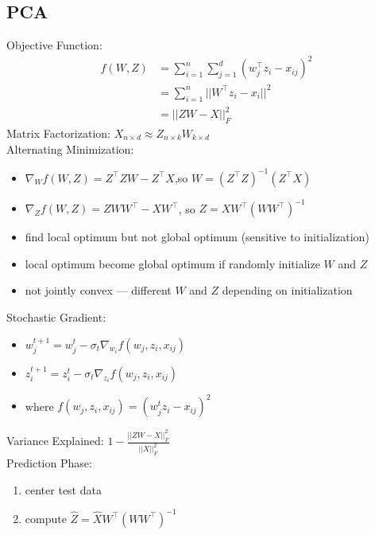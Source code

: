 \documentclass[10pt,landscape,a4paper]{article}
\begin{document}
\begin{multicols*}{5}

\section{PCA}
Objective Function:
\begin{align*}
    f(W,Z) &= \sum_{i=1}^{n} \sum_{j=1}^{d} (w_j^\intercal z_i - x_{ij})^2 \\
    &= \sum_{i=1}^{n} ||W^\intercal z_i - x_i||^2 \\
    &= ||ZW-X||_F^2
\end{align*}
Matrix Factorization: \(X_{n \times d} \approx Z_{n \times k} W_{k \times d}\) \\
Alternating Minimization:
\begin{itemize}
    \item \(\nabla_W f(W,Z) = Z^\intercal Z W - Z^\intercal X\),so \(W = (Z^\intercal Z)^{-1} (Z^\intercal X)\)
    \item \(\nabla_Z f(W,Z) = Z W W^\intercal - X W^\intercal \), so \(Z = X W^\intercal (W W^\intercal)^{-1}\)
    \item find local optimum but not global optimum (sensitive to initialization)
    \item local optimum become global optimum if randomly initialize \(W\) and \(Z\)
    \item not jointly convex --- different \(W\) and \(Z\) depending on initialization
\end{itemize}
Stochastic Gradient:
\begin{itemize}
    \item \(w_j^{t+1} = w_j^t - \sigma_t \nabla_{w_i} f(w_j,z_i,x_{ij})\)
    \item \(z_i^{t+1} = z_i^t - \sigma_t \nabla_{z_i} f(w_j,z_i,x_{ij})\)
    \item where \(f(w_j,z_i,x_{ij}) = (w_j^t z_i - x_{ij})^2\)
\end{itemize}
Variance Explained: \(1 - \frac{||ZW-X||_F^2}{||X||_F^2}\) \\
Prediction Phase:
\begin{enumerate}
    \item center test data
    \item compute \(\hat{Z} = \hat{X} W^\intercal (W W^\intercal)^{-1}\)

\end{enumerate}
\end{multicols*}
\end{document}

